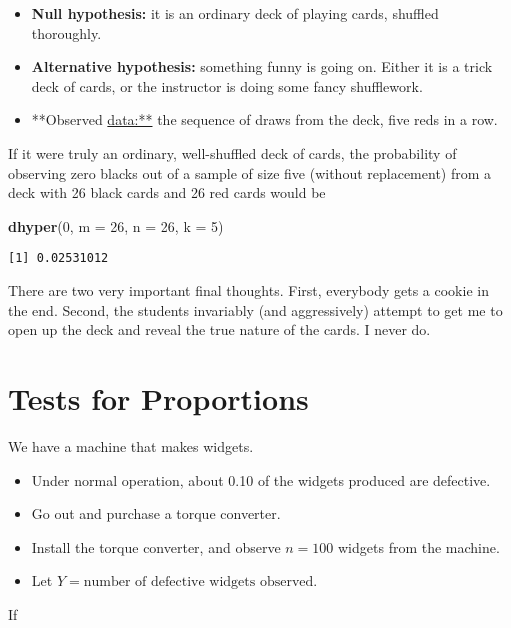\documentclass[]{book}
\newenvironment{Shaded}{\begin{snugshade}}{\end{snugshade}}
\newcommand{\KeywordTok}[1]{\textcolor[rgb]{0.13,0.29,0.53}{\textbf{{#1}}}}
\newcommand{\DataTypeTok}[1]{\textcolor[rgb]{0.13,0.29,0.53}{{#1}}}
\newcommand{\DecValTok}[1]{\textcolor[rgb]{0.00,0.00,0.81}{{#1}}}
\newcommand{\NormalTok}[1]{{#1}}
\providecommand{\tightlist}{%
  \setlength{\itemsep}{0pt}\setlength{\parskip}{0pt}}
\numberwithin{equation}{chapter}
\numberwithin{figure}{chapter}
\theoremstyle{plain}
\theoremstyle{definition}
\theoremstyle{remark}
\theoremstyle{definition}
\theoremstyle{definition}
\theoremstyle{remark}
\let\BeginKnitrBlock\begin \let\EndKnitrBlock\end
\begin{document}
\begin{itemize}
\tightlist
\item
  \textbf{Null hypothesis:} it is an ordinary deck of playing cards,
  shuffled thoroughly.
\item
  \textbf{Alternative hypothesis:} something funny is going on. Either
  it is a trick deck of cards, or the instructor is doing some fancy
  shufflework.
\item
  **Observed \url{data:**} the sequence of draws from the deck, five
  reds in a row.
\end{itemize}

If it were truly an ordinary, well-shuffled deck of cards, the
probability of observing zero blacks out of a sample of size five
(without replacement) from a deck with 26 black cards and 26 red cards
would be

\begin{Shaded}
\begin{Highlighting}[]
\KeywordTok{dhyper}\NormalTok{(}\DecValTok{0}\NormalTok{, }\DataTypeTok{m =} \DecValTok{26}\NormalTok{, }\DataTypeTok{n =} \DecValTok{26}\NormalTok{, }\DataTypeTok{k =} \DecValTok{5}\NormalTok{)}
\end{Highlighting}
\end{Shaded}

\begin{verbatim}
[1] 0.02531012
\end{verbatim}

There are two very important final thoughts. First, everybody gets a
cookie in the end. Second, the students invariably (and aggressively)
attempt to get me to open up the deck and reveal the true nature of the
cards. I never do.

\section{Tests for Proportions}\label{sec-tests-for-proportions}

\BeginKnitrBlock{example}
\protect\hypertarget{ex:widget-machine}{}{\label{ex:widget-machine}}We have
a machine that makes widgets.

\begin{itemize}
\tightlist
\item
  Under normal operation, about 0.10 of the widgets produced are
  defective.
\item
  Go out and purchase a torque converter.
\item
  Install the torque converter, and observe \(n=100\) widgets from the
  machine.
\item
  Let \(Y=\mbox{number of defective widgets observed}\).
\end{itemize}
\EndKnitrBlock{example} If
\end{document}
